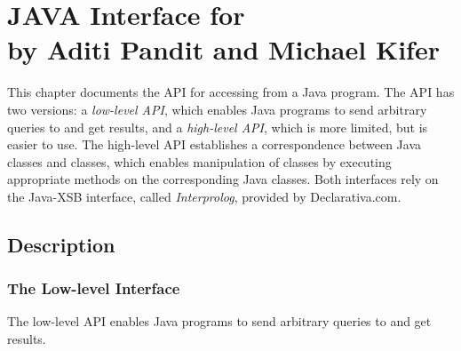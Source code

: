 

\chapter[JAVA Interface for \FLORA]{JAVA Interface for \FLORA\\by Aditi
      Pandit and Michael Kifer}


     This chapter documents the API for accessing \FLORA from a Java program.
  The API has two versions: a \emph{low-level API},
  which enables Java programs to
  send arbitrary queries to \FLORA and get results, and a \emph{high-level
    API}, which is more limited, but is easier to use. The high-level API
  establishes a correspondence between Java classes and \FLORA classes,
  which enables manipulation of \FLORA classes by executing appropriate
  methods on the corresponding Java classes. Both interfaces rely on the
  Java-XSB interface, called \emph{Interprolog}, provided by Declarativa.com.


\section{Description}
\subsection{The Low-level Interface}
 The low-level API enables Java programs to send arbitrary queries
to \FLORA and get results. 

